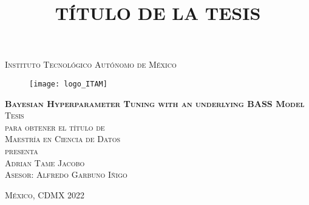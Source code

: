 

\title{TÍTULO DE LA TESIS} %

\begin{titlepage}
\begin{center}

\textsc{\Large Instituto Tecnológico Autónomo de México}\\[4em]

\begin{figure}[h]
\begin{center}
\texttt{[image: logo\_ITAM]}
\end{center}
\end{figure}

\vspace{4em}

\textsc{\huge \textbf{Bayesian Hyperparameter Tuning with an underlying BASS Model}}\\[4em]

\textsc{\large Tesis}\\[1em]

\textsc{para obtener el título de}\\[1em]

\textsc{Maestría en Ciencia de Datos}\\[1em]

\textsc{presenta}\\[1em]

\textsc{\Large Adrian Tame Jacobo}\\[1em]

\textsc{\large Asesor: Alfredo Garbuno Iñigo}

\end{center}

\vfill
\textsc{México, CDMX \hfill 2022}

\end{titlepage}